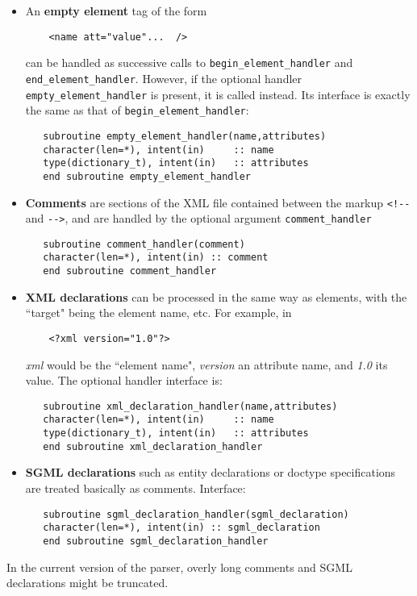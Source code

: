 \documentclass[11pt]{article}
\begin{document}
\begin{itemize}

\item
An \textbf{empty element} tag of the form
%
\begin{verbatim}
	<name att="value"...  />
\end{verbatim}
%
can be handled as successive calls to \texttt{begin\_element\_handler}
and \texttt{end\_element\_handler}.  However, if the optional handler
\texttt{empty\_element\_handler} is present, it is called instead. Its
interface is exactly the same as that of
\texttt{begin\_element\_handler}:
%
\begin{verbatim}
   subroutine empty_element_handler(name,attributes)
   character(len=*), intent(in)     :: name
   type(dictionary_t), intent(in)   :: attributes
   end subroutine empty_element_handler
\end{verbatim}
%
\item
\textbf{Comments} are sections of the XML file contained between the markup
\texttt{<!{-}-} and \texttt{{-}->}, 
and are handled by the optional argument \texttt{comment\_handler}
%
\begin{verbatim}
   subroutine comment_handler(comment)
   character(len=*), intent(in) :: comment
   end subroutine comment_handler
\end{verbatim}
%
\item
\textbf{XML declarations} can be processed
in the same way as elements, with the ``target" being the element name, etc. 
For example, in
%
\begin{verbatim}
	<?xml version="1.0"?>
\end{verbatim}
%
\textsl{xml} would be the ``element name", \textsl{version} an
attribute name, and \textsl{1.0} its value. The optional handler
interface is:
%
\begin{verbatim}
   subroutine xml_declaration_handler(name,attributes)
   character(len=*), intent(in)     :: name
   type(dictionary_t), intent(in)   :: attributes
   end subroutine xml_declaration_handler
\end{verbatim}
%
\item
\textbf{SGML declarations} such as entity declarations or doctype
specifications are treated basically as comments. Interface:
%
\begin{verbatim}
   subroutine sgml_declaration_handler(sgml_declaration)
   character(len=*), intent(in) :: sgml_declaration
   end subroutine sgml_declaration_handler
\end{verbatim}
%
\end{itemize}
In the current version of the parser, overly long comments and SGML
declarations might be truncated.
\end{document}
